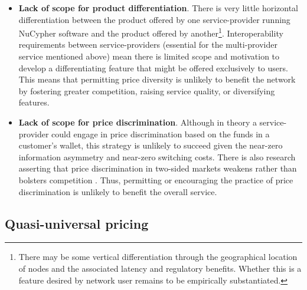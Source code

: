 \documentclass[longbibliography,nofootinbib]{revtex4-1}
\begin{document}
\begin{itemize}
    \item \textbf{Lack of scope for product differentiation}. There is very little horizontal differentiation between the product offered by one service-provider running NuCypher software and the product offered by another\footnote{There may be some vertical differentiation through the geographical location of nodes and the associated latency and regulatory benefits. Whether this is a feature desired by network user remains to be empirically substantiated.}. Interoperability requirements between service-providers (essential for the multi-provider service mentioned above) mean there is limited scope and motivation to develop a differentiating feature that might be offered exclusively to users. This means that permitting price diversity is unlikely to benefit the network by fostering greater competition, raising service quality, or diversifying features. 
    \item \textbf{Lack of scope for price discrimination}. Although in theory a service-provider could engage in price discrimination based on the funds in a customer’s wallet, this strategy is unlikely to succeed given the near-zero information asymmetry and near-zero switching costs. There is also research asserting that price discrimination in two-sided markets weakens rather than bolsters competition \cite{discrim}. Thus, permitting or encouraging the practice of price discrimination is unlikely to benefit the overall service.
\end{itemize}

\subsection{Quasi-universal pricing} \label{qup}
\end{document}
